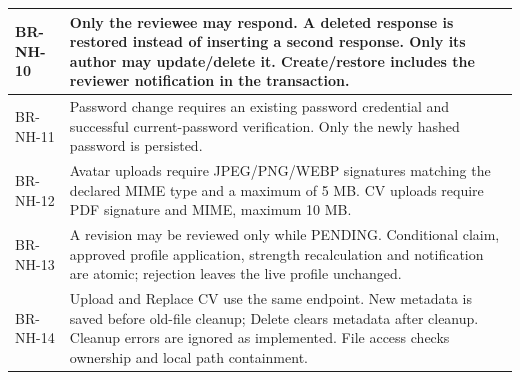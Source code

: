 \begin{longtable}{|L{2.4cm}|L{11.8cm}|}
BR-NH-10 & Only the reviewee may respond. A deleted response is restored instead of inserting a second response. Only its author may update/delete it. Create/restore includes the reviewer notification in the transaction. \\ \hline
BR-NH-11 & Password change requires an existing password credential and successful current-password verification. Only the newly hashed password is persisted. \\ \hline
BR-NH-12 & Avatar uploads require JPEG/PNG/WEBP signatures matching the declared MIME type and a maximum of 5 MB. CV uploads require PDF signature and MIME, maximum 10 MB. \\ \hline
BR-NH-13 & A revision may be reviewed only while PENDING. Conditional claim, approved profile application, strength recalculation and notification are atomic; rejection leaves the live profile unchanged. \\ \hline
BR-NH-14 & Upload and Replace CV use the same endpoint. New metadata is saved before old-file cleanup; Delete clears metadata after cleanup. Cleanup errors are ignored as implemented. File access checks ownership and local path containment. \\ \hline
\end{longtable}
